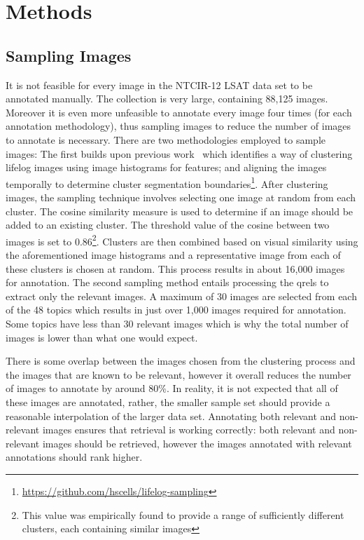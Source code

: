 \chapter{Methods}

\section{Sampling Images}

It is not feasible for every image in the NTCIR-12 LSAT data set to be annotated manually. The collection is very large, containing 88,125 images. Moreover it is even more unfeasible to annotate every image four times (for each annotation methodology), thus sampling images to reduce the number of images to annotate is necessary. There are two methodologies employed to sample images: The first builds upon previous work~\cite{scells2016qut} which identifies a way of clustering lifelog images using image histograms for features; and aligning the images temporally to determine cluster segmentation boundaries\footnote{\url{https://github.com/hscells/lifelog-sampling}}. After clustering images, the sampling technique involves selecting one image at random from each cluster. The cosine similarity measure is used to determine if an image should be added to an existing cluster. The threshold value of the cosine between two images is set to 0.86\footnote{This value was empirically found to provide a range of sufficiently different clusters, each containing similar images}. Clusters are then combined based on visual similarity using the aforementioned image histograms and a representative image from each of these clusters is chosen at random. This process results in about 16,000 images for annotation. The second sampling method entails processing the qrels to extract only the relevant images. A maximum of 30 images are selected from each of the 48 topics which results in just over 1,000 images required for annotation. Some topics have less than 30 relevant images which is why the total number of images is lower than what one would expect.

There is some overlap between the images chosen from the clustering process and the images that are known to be relevant, however it overall reduces the number of images to annotate by around 80\%. In reality, it is not expected that all of these images are annotated, rather, the smaller sample set should provide a reasonable interpolation of the larger data set. Annotating both relevant and non-relevant images ensures that retrieval is working correctly: both relevant and non-relevant images should be retrieved, however the images annotated with relevant annotations should rank higher.

